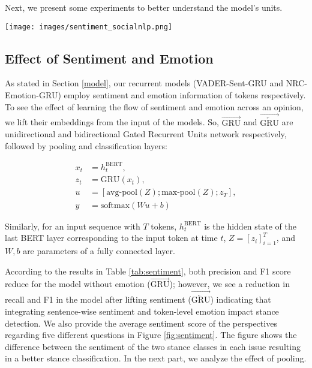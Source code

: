 \documentclass[11pt,a4paper]{article}
\begin{document}
Next, we present some experiments to better understand the model's units.
\begin{figure*}
\centering
  \texttt{[image: images/sentiment\_socialnlp.png]}
    \caption{\label{fig:sentiment} Average VADER sentiment scores across five different issues. In each issue the first bar belongs to proponents and the second bar belongs to the opponents}
    
\end{figure*}


\subsection{Effect of Sentiment and Emotion}
As stated in Section \ref{model}, our recurrent models (VADER-Sent-GRU and NRC-Emotion-GRU) employ sentiment and emotion information of tokens respectively.  To see the effect of learning the flow of sentiment and emotion across an opinion, we lift their embeddings from the input of the models. So, $\overrightarrow{\text{GRU}}$  and $\overrightarrow{\overleftarrow{\text{GRU}}}$  are  unidirectional and bidirectional  Gated Recurrent Units network respectively,  followed by pooling and classification layers:



\begin{equation*}
    \begin{aligned}
                 x_t  &= h_{t}^{\text{BERT}},\\
        z_{t}  &=  \text{GRU}(x_t),\\
        u   &=  [\text{avg-pool}(Z);\text{max-pool}(Z);z_T],\\
       y  &=   \text{softmax}(Wu+b)  
    \end{aligned}
    \end{equation*}
    

    Similarly, for an input sequence with $T$ tokens, $h_{t}^{\text{BERT}}$ is the hidden state of the last BERT layer corresponding to the input token at time  $t$, $Z=[z_i]_{i=1}^T$, and $W,b$ are parameters of a fully connected layer.



According to the results in Table \ref{tab:sentiment}, both precision and F1 score reduce for the model without emotion ($\overrightarrow{\text{GRU}}$); however, we see a reduction in recall and F1 in the model after lifting sentiment ($\overrightarrow{\overleftarrow{\text{GRU}}}$) indicating that integrating sentence-wise sentiment and token-level emotion impact stance detection. We also provide the average sentiment score of the perspectives regarding five different questions in Figure \ref{fig:sentiment}. The figure shows the difference between the sentiment of the two stance classes in each issue resulting in a better stance classification. In the next part, we analyze the effect of pooling. 
\end{document}
